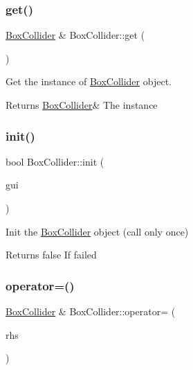 \subsubsection{\texorpdfstring{get()}{get()}}
{\footnotesize\ttfamily \hyperlink{class_box_collider}{Box\+Collider} \& Box\+Collider\+::get (\begin{DoxyParamCaption}{ }\end{DoxyParamCaption})\hspace{0.3cm}{\ttfamily [static]}}



Get the instance of \hyperlink{class_box_collider}{Box\+Collider} object. 

\begin{DoxyReturn}{Returns}
\hyperlink{class_box_collider}{Box\+Collider}\& The instance 
\end{DoxyReturn}
\mbox{\label{class_box_collider_a6f8b8b22f9845496c422236140818209}} 
\subsubsection{\texorpdfstring{init()}{init()}}
{\footnotesize\ttfamily bool Box\+Collider\+::init (\begin{DoxyParamCaption}\item[{\hyperlink{class_gui}{Gui} $\ast$}]{gui }\end{DoxyParamCaption})\hspace{0.3cm}{\ttfamily [static]}}



Init the \hyperlink{class_box_collider}{Box\+Collider} object (call only once) 

\begin{DoxyReturn}{Returns}
false If failed 
\end{DoxyReturn}
\mbox{\label{class_box_collider_a785e2defc2d9deab26589149262ff114}} 
\subsubsection{\texorpdfstring{operator=()}{operator=()}}
{\footnotesize\ttfamily \hyperlink{class_box_collider}{Box\+Collider} \& Box\+Collider\+::operator= (\begin{DoxyParamCaption}\item[{\hyperlink{class_box_collider}{Box\+Collider} const \&}]{rhs }\end{DoxyParamCaption})}



